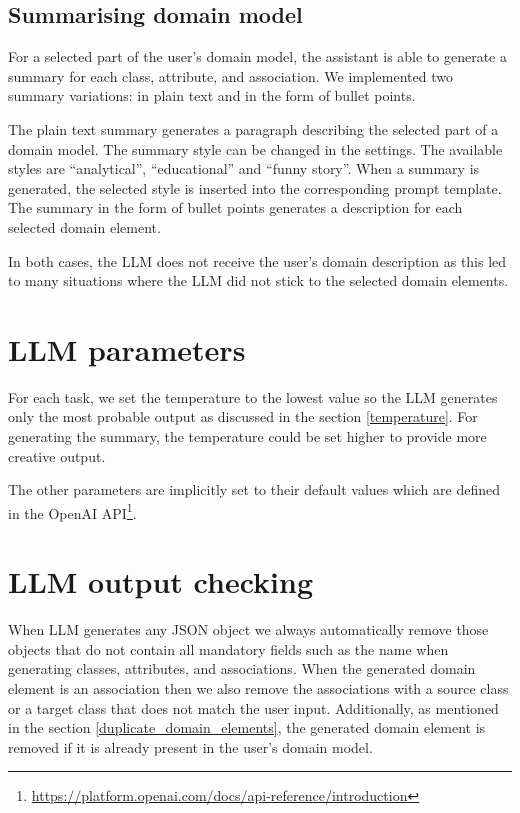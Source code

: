 \subsection{Summarising domain model}
\label{summarising_domain_model}

For a selected part of the user's domain model, the assistant is able to generate a summary for each class, attribute, and association. We implemented two summary variations: in plain text and in the form of bullet points.

The plain text summary generates a paragraph describing the selected part of a domain model. The summary style can be changed in the settings. The available styles are ``analytical'', ``educational'' and ``funny story''. When a summary is generated, the selected style is inserted into the corresponding prompt template. The summary in the form of bullet points generates a description for each selected domain element.

In both cases, the LLM does not receive the user's domain description as this led to many situations where the LLM did not stick to the selected domain elements.


\section{LLM parameters}

For each task, we set the temperature to the lowest value so the LLM generates only the most probable output as discussed in the section \ref{temperature}. For generating the summary, the temperature could be set higher to provide more creative output.

The other parameters are implicitly set to their default values which are defined in the OpenAI API\footnote{\url{https://platform.openai.com/docs/api-reference/introduction}}.


\section{LLM output checking}

When LLM generates any JSON object we always automatically remove those objects that do not contain all mandatory fields such as the name when generating classes, attributes, and associations. When the generated domain element is an association then we also remove the associations with a source class or a target class that does not match the user input. Additionally, as mentioned in the section \ref{duplicate_domain_elements}, the generated domain element is removed if it is already present in the user's domain model.


